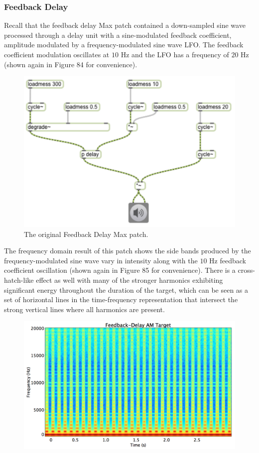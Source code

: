 \documentclass[12pt]{report} 	%
\numberwithin{figure}{chapter}
\numberwithin{table}{chapter}
\numberwithin{equation}{chapter}
\begin{document}
\begin{flushleft}
\subsubsection{Feedback Delay}
Recall that the feedback delay Max patch contained a down-sampled sine wave processed through a delay unit with a sine-modulated feedback coefficient, amplitude modulated by a frequency-modulated sine wave LFO. The feedback coefficient modulation oscillates at $10$ Hz and the LFO has a frequency of $20$ Hz (shown again in Figure 84 for convenience).
\begin{figure}[h!]
\begin{center}
\includegraphics[scale=0.8]{DelayFeedbackAM}
\caption[Original feedback delay Max patch]{The original Feedback Delay Max patch.}
\end{center}
\end{figure}
The frequency domain result of this patch shows the side bands produced by the frequency-modulated sine wave vary in intensity along with the $10$ Hz feedback coefficient oscillation (shown again in Figure 85 for convenience). There is a cross-hatch-like effect as well with many of the stronger harmonics exhibiting significant energy throughout the duration of the target, which can be seen as a set of horizontal lines in the time-frequency representation that intersect the strong vertical lines where all harmonics are present.
\begin{figure}[h!]
\begin{center}
\includegraphics[scale=0.35,width=\linewidth]{FeedbackDelayAMTargetSTFT}

\end{center}
\end{figure}
\end{flushleft}
\end{document}
